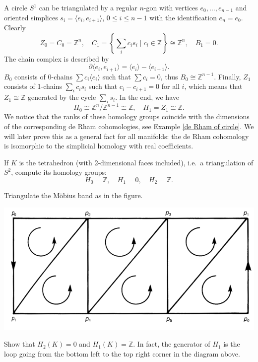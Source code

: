 \documentclass[english,letterpaper]{article}%
\numberwithin{equation}{section}
\numberwithin{figure}{section}
\numberwithin{table}{section}
\theoremstyle{definition}
\theoremstyle{definition}
\theoremstyle{definition}
\theoremstyle{plain}
\theoremstyle{plain}
\theoremstyle{plain}
\theoremstyle{plain}
\theoremstyle{remark}
\theoremstyle{remark}
\def\red{\color{red}}
\newcommand{\bbZ}{\mathbb{Z}}
\renewcommand{\leq}{\leqslant}
\newcommand{\PRLsep}{   %
           \noindent\makebox[\linewidth]{
                \resizebox{0.5\linewidth}{1pt}{$\blacklozenge$}}}
\begin{document}

\begin{example}
    A circle $S^1$ can be triangulated by a regular $n$-gon with vertices  $e_0,\ldots,e_{n-1}$ and oriented simplices $s_i=\langle e_i,e_{i+1}\rangle$, $0\leq i\leq n-1$ with the identification $e_n=e_0$. 
    Clearly 
    \[Z_0=C_0=\bbZ^n,\quad C_1=\left\{\sum_i c_i s_i \mid c_i\in \bbZ\right\}\cong \bbZ^n,\quad B_1=0.\]
    The chain complex is described by 
    \[\partial\langle e_i,e_{i+1}\rangle=\langle e_i\rangle-\langle e_{i+1}\rangle .\]
    $B_0$ consists of 0-chains $\sum c_i \langle e_i\rangle$ such that $\sum c_i=0$, thus $B_0\cong \bbZ^{n-1}$.
    Finally, $Z_1$ consists of 1-chains $\sum_i c_i s_i$ such that $c_i-c_{i+1}=0$ for all $i$, which means that $Z_1\cong \bbZ$ generated by the cycle $\sum_i s_i$. In the end, we have
    \[H_0\cong \bbZ^n/\bbZ^{n-1}\cong \bbZ,\quad H_1=Z_1\cong \bbZ. \]
    We notice that the ranks of these homology groups coincide with the dimensions of the corresponding de Rham cohomologies, see Example \ref{de Rham of circle}. We will later prove this as a general fact for all manifolds: the de Rham cohomology is isomorphic to the simplicial homology with real coefficients.
\end{example}


\begin{xca}
    If $K$ is the tetrahedron (with 2-dimensional faces included), i.e.\ a triangulation of $S^2$, compute its homology groups:
    \[H_0=\bbZ,\quad H_1=0,\quad H_2=\bbZ.\]
\end{xca}
\begin{xca}
    Triangulate the M\"obius band as in the figure.
    \begin{center}
        \includegraphics[scale=0.2]{Images/mobius.png}
    \end{center}
    Show that $H_2(K)=0$ and $H_1(K)=\bbZ$. In fact, the generator of $H_1$ is the loop going from the bottom left to the top right corner in the diagram above.
\end{xca}
\end{document}
